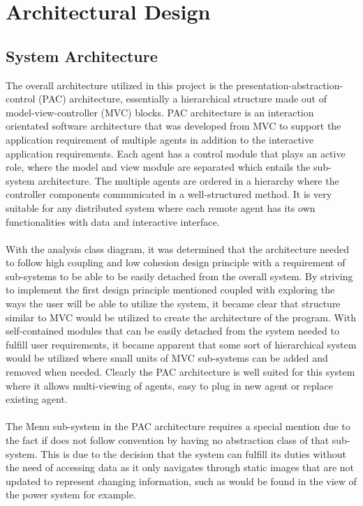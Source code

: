 \documentclass[12pt, titlepage]{article}
\newcommand\tab[1][1cm]{\hspace*{#1}}
\begin{document}
\section{Architectural Design}
\label{sec:architectural_design}

\subsection{System Architecture}
\label{sub:system_architecture}
\tab The overall architecture utilized in this project is the presentation-abstraction-control (PAC) architecture, essentially a hierarchical structure made out of model-view-controller (MVC) blocks. PAC architecture is an interaction orientated software architecture that was developed from MVC to support the application requirement of multiple agents in addition to the interactive application requirements. Each agent has a control module that plays an active role, where the model and view module are separated which entails the sub-system architecture. The multiple agents are ordered in a hierarchy where the controller components communicated in a well-structured method. It is very suitable for any distributed system where each remote agent has its own functionalities with data and interactive interface. \\ \\
\tab With the analysis class diagram, it was determined that the architecture needed to follow high coupling and low cohesion design principle with a requirement of sub-systems to be able to be easily detached from the overall system. By striving to implement the first design principle mentioned coupled with exploring the ways the user will be able to utilize the system, it became clear that structure similar to MVC would be utilized to create the architecture of the program. With self-contained modules that can be easily detached from the system needed to fulfill user requirements, it became apparent that some sort of hierarchical system would be utilized where small units of MVC sub-systems can be added and removed when needed. Clearly the PAC 	architecture is well suited for this system where it allows multi-viewing of agents, easy to plug in new agent or replace existing agent.  \\ \\
\tab The Menu sub-system in the PAC architecture requires a special mention due to the fact if does not follow convention by having no abstraction class of that sub-system. This is due to the decision that the system can fulfill its duties without the need of accessing data as it only navigates through static images that are not updated to represent changing information, such as would be found in the view of the power system for example.
\end{document}
